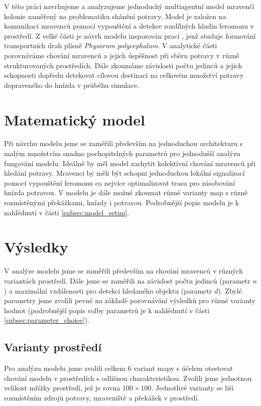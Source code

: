 \documentclass[10pt,a4paper,twocolumn]{article}
\begin{document}
V této práci navrhujeme a analyzujeme jednoduchý multiagentní model mravenčí 
kolonie zaměřený na problematiku shánění potravy. Model je založen na komunikaci
mravenců pomocí vypouštění a detekce rozdílných hladin feromonu v prostředí.
Z velké části je návrh modelu insporován prací \citet{jones2010characteristics}, 
jenž studuje
formování transportních drah plísně \emph{Physarum polycephalum}. V analytické části
porovnáváme chování mravenců a jejich úspěšnost při sběru potravy v různě 
strukturovaných prostředích. Dále zkoumáme závislosti počtu jedinců a jejich 
schopnosti dopředu detekovat cílovou destinaci na celkovém množství potravy 
dopraveného do hnízda v průběhu simulace. 


\section{Matematický model}
Při návrhu modelu jsme se zaměřili především na jednoduchou architekturu s
malým množstvím snadno pochopitelných parametrů pro jednodušší analýzu 
fungování modelu.
Ideálně by měl model zachytit kolektivní chování mravenců při hledání potravy.
Mravenci by měli být schopni jednoduchou lokální signalizací pomocí
vypouštění feromonu co nejvíce optimalizovat trasu pro zásobování hnízda
potravou. V modelu je dále možné zkoumat různé varianty map s různě 
rozmístěnými překážkami, hnízdy i potravou. Podrobnější popis modelu
je k nahlédnutí v části \ref{subsec:model_setup}.

\section{Výsledky}

V analýze modelu jsme se zaměřili především na chování mravenců v různých
variantách prostředí. Dále jsme se zaměřili na závislost počtu
jedinců (parametr $n$) a maximální vzdálenosti pro detekci hledaného 
objektu (parametr $d$). Zbylé parametry jsme zvolili pevně na základě
porovnávání výsledků pro různé varianty hodnot (podrobnější popis 
volby parametrů je k nahlédnutí v části \ref{subsec:parameter_choice}).

\subsection{Varianty prostředí}
\label{subsec:map_variants}
Pro analýzu modelu jsme zvolili celkem 6 variant mapy s účelem otestovat
chování modelu v prostředích s odlišnou charakteristikou. Zvolili jsme 
jednotnou velikost mřížky prostředí, jež je rovna $100 \times 100$.
Jednotlivé varianty se liší rozmístěním zdrojů potravy, mraveniště a překážek
v prostředí.
\end{document}
